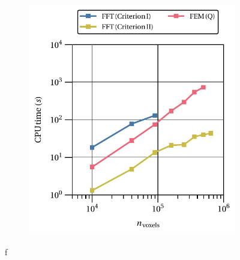 \begin{figure}[hbt]
\begin{subfigure}[b]{0.49\textwidth}
    \includegraphics[width=\textwidth]{figures/von_mises_small_strain_2D_normal_cpu_time_vs_n_voxels}
    \caption{}
    \label{subfig:hencky_2D_normal_cpu_time_vs_n_voxels}
  \end{subfigure}
\caption{f}
\label{fig:linear_2D_normal_comparison_crit}
\end{figure}

